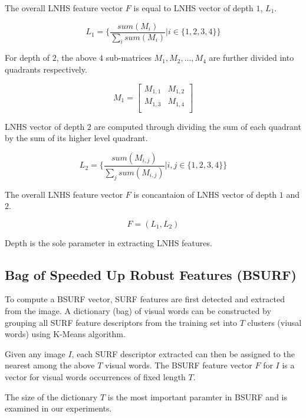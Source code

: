 The overall LNHS feature vector $F$ is equal to LNHS vector of depth $1$, $L_1$.

\begin{equation}
L_1 = \{\frac{sum(M_i)}{\sum_i sum(M_i)} | i \in \{1, 2, 3, 4\} \}
\end{equation}


For depth of $2$, the above $4$ sub-matrices $M_{1}, M_{2}, \dots, M_{4}$ are further divided into quadrants respectively.

\begin{equation}
M_{1} = 
\begin{bmatrix}
  M_{1,1}&  M_{1,2}\\
  M_{1,3}&  M_{1,4}\\
\end{bmatrix}
\end{equation}

LNHS vector of depth $2$ are computed through dividing the sum of each quadrant by the sum of its higher level quadrant.

\begin{equation}
L_2 = \{\frac{sum(M_{i,j})}{\sum_j sum(M_{i,j})} | i,j \in \{1, 2, 3, 4\}\}
\end{equation}

The overall LNHS feature vector $F$ is concantaion of LNHS vector of depth $1$ and $2$.

\begin{equation}
F = (L_1, L_2)
\end{equation}

Depth is the sole parameter in extracting LNHS features.

\subsection{Bag of Speeded Up Robust Features (BSURF)}
To compute a BSURF vector, SURF features \citep{bay2006surf} are first detected and extracted from the image.
A dictionary (bag) of visual words can be constructed by grouping all SURF feature descriptors from the training set into $T$ clusters (viusal words) using K-Means algorithm.

Given any image $I$, each SURF descriptor extracted can then be assigned to the nearest among the above $T$ visual words.
The BSURF feature vector $F$ for $I$ is a vector for visual words occurrences of fixed length $T$.

The size of the dictionary $T$ is the most important paramter in BSURF and is examined in our experiments.



